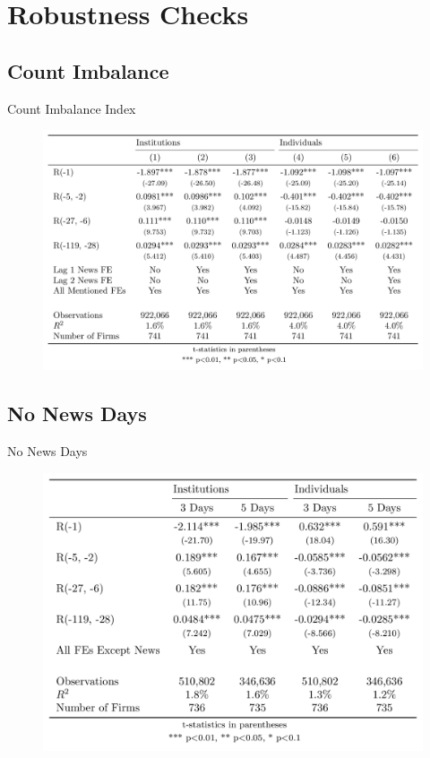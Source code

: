 \documentclass{beamer}
\begin{document}
\section{Robustness Checks}
\subsection{Count Imbalance}

\begin{frame}{Count Imbalance Index}
    \begin{figure}
        \includegraphics[width=\textwidth]{ci.png}
    \end{figure}
\end{frame}


\subsection{No News Days}


\begin{frame}{No News Days}
    \begin{figure}
        \includegraphics[scale = .22]{nonews.png}
    \end{figure}
\end{frame}
\end{document}
